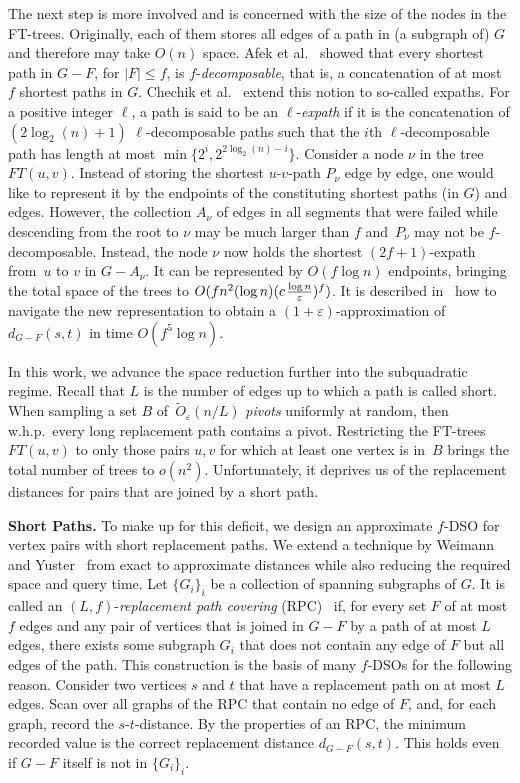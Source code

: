 \documentclass{theoretics}
\newcommand*{\Otilde}{\widetilde{O}}
\newcommand*{\nwspace}{\hspace*{.1em}}
\renewcommand{\le}{\leqslant}
\newcommand{\eps}{\varepsilon}
\begin{document}
The next step is more involved and is concerned with the size of the nodes in the FT-trees.
Originally, each of them stores all edges of a path in (a subgraph of) $G$ 
and therefore may take $O(n)$ space.
Afek et al.~\cite{Afek02RestorationbyPathConcatenation_journal}
showed that every shortest path in $G{-}F$, for $|F| \le f$, is  $f$-\emph{decomposable},
that is, a concatenation of at most $f$ shortest paths in $G$.
Chechik et al.~\cite{ChCoFiKa17} extend this notion to so-called expaths.
For a positive integer $\ell$, a path is said to be an \mbox{$\ell$-\emph{expath}}
if it is the concatenation of $(2\log_2(n)+1)$ \mbox{$\ell$-decomposable} paths
such that the $i$th $\ell$-decomposable path has length at most $\min\{ 2^i,2^{2\log_2(n) -i}\}$.
Consider a node $\nu$ in the tree $FT(u,v)$.
Instead of storing the shortest $u$-$v$-path $P_\nu$ edge by edge,
one would like to represent it
by the endpoints of the constituting shortest paths (in $G$) and edges.
However, the collection $A_\nu$ of edges in all segments
that were failed while descending from the root to $\nu$ may be much larger than $f$
and~$P_{\nu}$ may not be $f$-decomposable.
Instead, the node $\nu$ now holds the shortest $(2f{+}1)$-expath from~$u$ to $v$ in $G-A_\nu$.
It can be represented by $O(f \log n)$ endpoints,
bringing the total space of the trees to $O(fn^2 (\log n)(c \nwspace \frac{\log n}{\eps})^f)$.
It is described in~\cite{ChCoFiKa17} how to navigate the new representation
to obtain a $(1{+}\eps)$-approximation of $d_{G-F}(s,t)$ in time $O(f^5 \log n)$.

In this work, we advance the space reduction further into the subquadratic regime.
Recall that $L$ is the number of edges up to which a path is called short.
When sampling a set $B$ of~$\Otilde_\eps(n/L)$ \emph{pivots} uniformly at random,
then w.h.p.\ every long replacement path contains a pivot. 
Restricting the FT-trees $FT(u,v)$ to only those pairs $u,v$ 
for which at least one vertex is in~$B$ brings the total number of trees to $o(n^2)$.
Unfortunately, it deprives us of the replacement distances for pairs
that are joined by a short path.
\vspace*{.5em}

\noindent
\textbf{Short Paths.}
To make up for this deficit, we design an approximate $f$-DSO for
vertex pairs with short replacement paths.
We extend a technique by Weimann and Yuster~\cite{WY13}
from exact to approximate distances while also reducing the required space and query time.
Let $\{G_i\}_i$ be a collection of spanning subgraphs of $G$.
It is called an 
$(L,f)$-\emph{replacement path covering} (RPC)~\cite{KarthikParter21DeterministicRPC}
if, for every set $F$ of at most $f$ edges and any pair of vertices that is joined in $G{-}F$
by a path of at most $L$ edges, there exists some subgraph $G_i$ that does not contain any edge of $F$
but all edges of the path.
This construction is the basis of many $f$-DSOs for the following reason.
Consider two vertices $s$ and $t$ that have a replacement path on at most $L$ edges.
Scan over all graphs of the RPC that contain no edge of $F$,
and, for each graph, record the $s$-$t$-distance.
By the properties of an RPC, the minimum recorded value is the correct replacement distance $d_{G-F}(s,t)$.
This holds even if $G{-}F$ itself is not in $\{G_i\}_i$.
\end{document}
